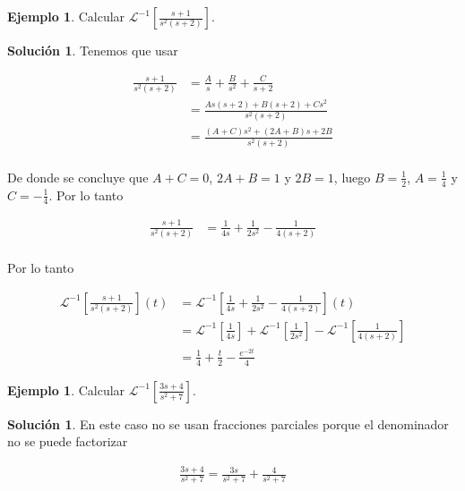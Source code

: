 \documentclass{article}
\theoremstyle{plain}
\theoremstyle{definition}
\newtheorem{ejem}[thm]{Ejemplo}
\newtheorem{sol}[thm]{Solución}
\begin{document}
\begin{ejem}Calcular $\displaystyle \mathcal{L}^{-1}\left[ \frac{s+1}{s^2(s+2)} \right] $. \\
\end{ejem}

\begin{sol}Tenemos que usar
\end{sol}

\begin{align*}
\displaystyle  \frac{s+1}{s^2(s+2)} &= \frac{A}{s}+\frac{B}{s^2}+\frac{C}{s+2} \\
&= \frac{As(s+2)+ B(s+2)+Cs^2}{s^2(s+2)} \\
&= \frac{(A+C)s^2+(2A+B)s+2B}{s^2(s+2)} \\
\end{align*}

De donde se concluye que $A+C=0$, $2A+B=1$ y $2B=1$, luego $B=\frac{1}{2}$, $A=\frac{1}{4}$ y $C=- \frac{1}{4}$. Por lo tanto



\begin{align*}
\displaystyle  \frac{s+1}{s^2(s+2)} &= \frac{1}{4s}+\frac{1}{2s^2}-\frac{1}{4(s+2)} \\
\end{align*}

Por lo tanto



\begin{align*}
\displaystyle  \mathcal{L}^{-1}\left[ \frac{s+1}{s^2(s+2)} \right](t) &= \mathcal{L}^{-1}\left[ \frac{1}{4s}+\frac{1}{2s^2}-\frac{1}{4(s+2)} \right](t) \\
 &= \mathcal{L}^{-1}\left[ \frac{1}{4s}\right] + \mathcal{L}^{-1}\left[ \frac{1}{2s^2} \right]- \mathcal{L}^{-1}\left[ \frac{1}{4(s+2)} \right] \\
 &= \frac{1}{4}+ \frac{t}{2}-\frac{e^{-2t}}{4}
\end{align*}


\begin{ejem}Calcular $\displaystyle \mathcal{L}^{-1}\left[ \frac{3s+4}{s^2+7} \right] $. \\
\end{ejem}

\begin{sol}En este caso no se usan fracciones parciales porque el denominador no se puede factorizar
\end{sol}

\begin{align*}
\displaystyle  \frac{3s+4}{s^2+7} = \frac{3s}{s^2+7}  + \frac{4}{s^2+7} \\
\end{align*}
\end{document}
